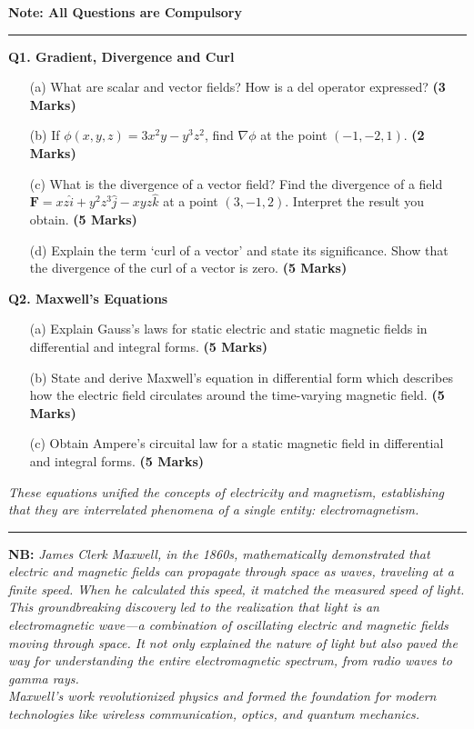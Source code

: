 \documentclass[a4paper,12pt]{article}
\begin{document}
\begin{center}
\textbf{\large Note: All Questions are Compulsory} 
\end{center}
\hrule
\vspace{0.5cm}
	
\textbf{Q1. Gradient, Divergence and Curl}
\begin{enumerate}
\item[(a)] What are scalar and vector fields? How is a del operator expressed?  \hfill {\textbf{(3 Marks)}}

\item[(b)] If $\phi(x,y,z) = 3x^2y - y^3z^2$, find $\nabla \phi$ at the point $(-1, -2, 1)$. \hfill {\textbf{(2 Marks)}}

\item[(c)] What is the divergence of a vector field? Find the divergence of a field $\mathbf{F} = xz \hat{i} + y^2 z^3 \hat{j} - xyz \hat{k}$ at a point $(3, -1, 2)$. Interpret the result you obtain. \hfill {\textbf{(5 Marks)}}

\item[(d)] Explain the term ‘curl of a vector’ and state its significance. Show that the divergence of the curl of a vector is zero.   \textbf{(5 Marks)}
\end{enumerate}
	
\vspace{0.5cm}

\textbf{Q2. Maxwell's Equations}
\begin{enumerate}
\item[(a)] Explain Gauss’s laws for static electric and static magnetic fields in differential and integral forms. \hfill {\textbf{(5 Marks)}}

\item[(b)] State and derive Maxwell’s equation in differential form which describes how the electric field circulates around the time-varying magnetic field. \hfill {\textbf{(5 Marks)}}

\item[(c)] Obtain Ampere’s circuital law for a static magnetic field in differential and integral forms. \hfill {\textbf{(5 Marks)}}
\end{enumerate}

\textit{These equations unified the concepts of electricity and magnetism, establishing that they are interrelated phenomena of a single entity: electromagnetism.} \\
 
\hrule
\vspace{0.5cm}
\textbf{NB:}
\textit{James Clerk Maxwell, in the 1860s, mathematically demonstrated that electric and magnetic fields can propagate through space as waves, traveling at a finite speed. When he calculated this speed, it matched the measured speed of light. This groundbreaking discovery led to the realization that light is an electromagnetic wave—a combination of oscillating electric and magnetic fields moving through space. It not only explained the nature of light but also paved the way for understanding the entire electromagnetic spectrum, from radio waves to gamma rays.} \\

\textit{Maxwell's work revolutionized physics and formed the foundation for modern technologies like wireless communication, optics, and quantum mechanics.}
	
\end{document}
